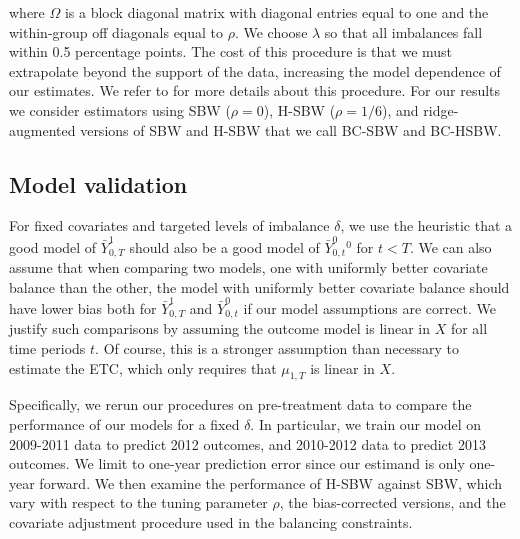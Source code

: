 \documentclass[aoas]{imsart}
\theoremstyle{plain}
\theoremstyle{remark}
\begin{document}
where $\Omega$ is a block diagonal matrix with diagonal entries equal to one and the within-group off diagonals equal to $\rho$. We choose $\lambda$ so that all imbalances fall within 0.5 percentage points. The cost of this procedure is that we must extrapolate beyond the support of the data, increasing the model dependence of our estimates. We refer to \cite{ben2018augmented} for more details about this procedure. For our results we consider estimators using SBW ($\rho = 0$), H-SBW ($\rho = 1/6$), and ridge-augmented versions of SBW and H-SBW that we call BC-SBW and BC-HSBW. 

\subsection{Model validation}

For fixed covariates and targeted levels of imbalance $\delta$, we use the heuristic that a good model of $\bar{Y}^1_{0,T}$ should also be a good model of $\bar{Y}^0_{0,t}^0$ for $t < T$. We can also assume that when comparing two models, one with uniformly better covariate balance than the other, the model with uniformly better covariate balance should have lower bias both for $\bar{Y}_{0,T}^1$ and $\bar{Y}_{0,t}^0$ if our model assumptions are correct. We justify such comparisons by assuming the outcome model is linear in $X$ for all time periods $t$. Of course, this is a stronger assumption than necessary to estimate the ETC, which only requires that $\mu_{1,T}$ is linear in $X$. 

Specifically, we rerun our procedures on pre-treatment data to compare the performance of our models for a fixed $\delta$. In particular, we train our model on 2009-2011 data to predict 2012 outcomes, and 2010-2012 data to predict 2013 outcomes. We limit to one-year prediction error since our estimand is only one-year forward. We then examine the performance of H-SBW against SBW, which vary with respect to the tuning parameter $\rho$, the bias-corrected versions, and the covariate adjustment procedure used in the balancing constraints. 
\end{document}
